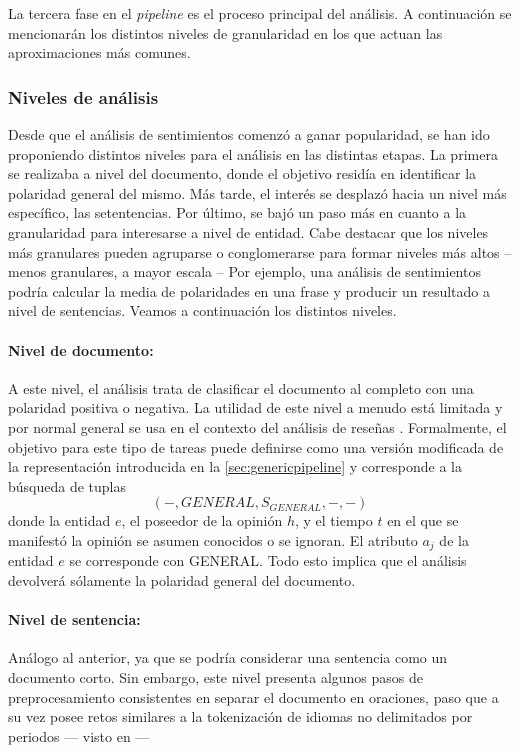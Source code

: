 La tercera fase en el \emph{pipeline} es el proceso principal del análisis. A
continuación se mencionarán los distintos niveles de granularidad en los que
actuan las aproximaciones más comunes.

\subsubsection{Niveles de análisis}
\label{sec:anallevels}

Desde que el análisis de sentimientos comenzó a ganar popularidad, se han ido
proponiendo distintos niveles para el análisis en las distintas etapas. La
primera se realizaba a nivel del documento, donde el objetivo residía en
identificar la polaridad general del mismo. Más tarde, el interés se desplazó
hacia un nivel más específico, las setentencias. Por último, se bajó un paso más
en cuanto a la granularidad para interesarse a nivel de entidad. Cabe destacar
que los niveles más granulares pueden agruparse o conglomerarse para formar
niveles más altos -- menos granulares, a mayor escala -- Por ejemplo, una
análisis de sentimientos podría calcular la media de polaridades en una frase y
producir un resultado a nivel de sentencias. Veamos a continuación los distintos
niveles.

\paragraph{Nivel de documento:}A este nivel, el análisis trata de clasificar el
documento al completo con una polaridad positiva o negativa. La utilidad de este
nivel a menudo está limitada y por normal general se usa en el contexto del
análisis de reseñas \cite{Liu2012}. Formalmente, el objetivo para este tipo de
tareas puede definirse como una versión modificada de la representación
introducida en la \autoref{sec:genericpipeline} y corresponde a la búsqueda de
tuplas
\[
  (-, GENERAL, S_{GENERAL}, -, -)
\]
donde la entidad $e$, el poseedor de la opinión $h$, y el tiempo $t$ en el que
se manifestó la opinión se asumen conocidos o se ignoran. El atributo $a_j$ de
la entidad $e$ se corresponde con GENERAL. Todo esto implica que el análisis
devolverá sólamente la polaridad general del documento.

\paragraph{Nivel de sentencia:} Análogo al anterior, ya que se podría considerar
una sentencia como un documento corto. Sin embargo, este nivel presenta algunos
pasos de preprocesamiento consistentes en separar el documento en oraciones,
paso que a su vez posee retos similares a la tokenización de idiomas no
delimitados por periodos --- visto en  ---

